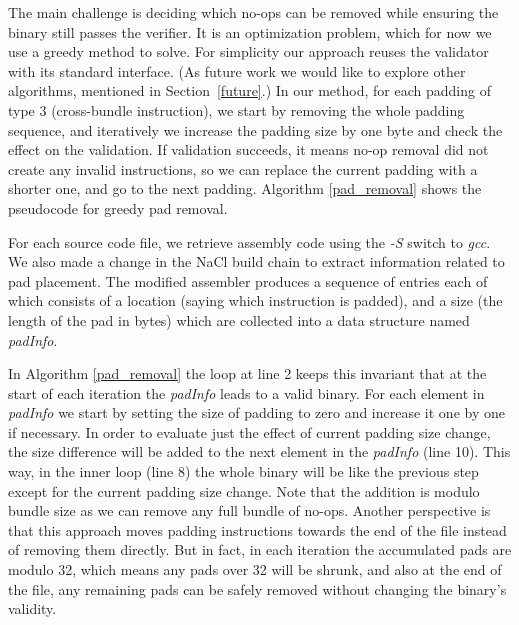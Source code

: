 \documentclass[conference]{IEEEtran}
\begin{document}
The main challenge is deciding which no-ops can be  removed while ensuring the binary still passes the verifier. It is an optimization problem, which for now we use a greedy method to solve. For simplicity our approach reuses the validator with its standard interface. (As future work we would like to explore other algorithms, mentioned in Section~\ref{future}.) In our method, for each padding of type 3 (cross-bundle instruction), we start by removing the whole padding sequence, and iteratively we increase the padding size by one byte and check the effect on the validation. If validation succeeds, it means no-op removal did not create any invalid instructions, so we can replace the current padding with a shorter one, and go to the next padding. Algorithm \ref{pad_removal} shows the pseudocode for greedy pad removal. 





For each source code file, we retrieve assembly code using the \textit{-S} switch to \textit{gcc}. We also made a change in the NaCl build chain to extract information related to pad placement. The modified assembler produces a sequence of entries each of which  consists of a  location (saying which instruction is  padded), and a size (the length of the pad in bytes) which are collected into a data structure named \textit{padInfo}.

In Algorithm \ref{pad_removal} the loop at line 2 keeps this invariant that at the start of each iteration the \textit{padInfo} leads to a valid binary. 
For each element in \textit{padInfo} we start by setting the size of padding to zero and increase it one by one if necessary. In order to evaluate just the effect of current padding size change, the size difference will be added to the next element in the \textit{padInfo} (line 10). 
This way, in the inner loop (line 8) the whole binary will be like the previous step except for the current padding size change. 
Note that the addition is modulo bundle size as we can remove any full bundle of no-ops.
Another perspective is that this approach moves padding instructions towards the end of the file instead of removing them directly.
But in fact, in each iteration the accumulated pads are modulo 32, which means any pads over 32 will be shrunk, 
and also at the end of the file, any remaining pads can be safely removed without changing the binary's validity.
\end{document}
